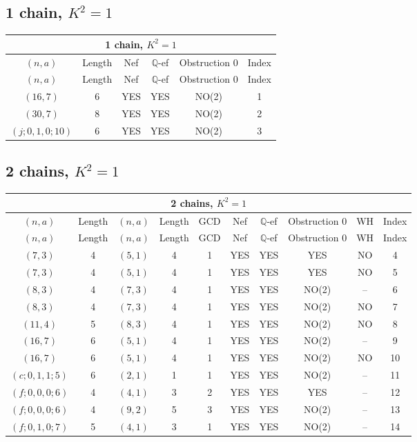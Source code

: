 \subsection{1 chain, $K^2 = 1$}
\begin{longtable}{|c|c|c|c|c|c|}
\hline
\multicolumn{6}{|c|}{1 chain, $K^2 = 1$}\\
\hline
$(n,a)$ & Length & Nef & $\mathbb Q$-ef & Obstruction 0 & Index\\
\hline
\endfirsthead

\hline
$(n,a)$ & Length & Nef & $\mathbb Q$-ef & Obstruction 0 & Index\\
\hline
\endhead
\hline
\endfoot

$(16, 7)$ & 6 & YES & YES & NO(2) & 1\\
$(30, 7)$ & 8 & YES & YES & NO(2) & 2\\
$(j; 0, 1, 0; 10)$ & 6 & YES & YES & NO(2) & 3
\end{longtable}
\subsection{2 chains, $K^2 = 1$}
\begin{longtable}{|c|c|c|c|c|c|c|c|c|c|}
\hline
\multicolumn{10}{|c|}{2 chains, $K^2 = 1$}\\
\hline
$(n,a)$ & Length & $(n,a)$ & Length & GCD & Nef & $\mathbb Q$-ef & Obstruction 0 & WH & Index\\
\hline
\endfirsthead

\hline
$(n,a)$ & Length & $(n,a)$ & Length & GCD & Nef & $\mathbb Q$-ef & Obstruction 0 & WH & Index\\
\hline
\endhead
\hline
\endfoot

$(7, 3)$ & 4 & $(5, 1)$ & 4 & 1 & YES & YES & YES & NO & 4\\
$(7, 3)$ & 4 & $(5, 1)$ & 4 & 1 & YES & YES & YES & NO & 5\\
$(8, 3)$ & 4 & $(7, 3)$ & 4 & 1 & YES & YES & NO(2) & -- & 6\\
$(8, 3)$ & 4 & $(7, 3)$ & 4 & 1 & YES & YES & NO(2) & NO & 7\\
$(11, 4)$ & 5 & $(8, 3)$ & 4 & 1 & YES & YES & NO(2) & NO & 8\\
$(16, 7)$ & 6 & $(5, 1)$ & 4 & 1 & YES & YES & NO(2) & -- & 9\\
$(16, 7)$ & 6 & $(5, 1)$ & 4 & 1 & YES & YES & NO(2) & NO & 10\\
$(c; 0, 1, 1; 5)$ & 6 & $(2, 1)$ & 1 & 1 & YES & YES & NO(2) & -- & 11\\
$(f; 0, 0, 0; 6)$ & 4 & $(4, 1)$ & 3 & 2 & YES & YES & YES & -- & 12\\
$(f; 0, 0, 0; 6)$ & 4 & $(9, 2)$ & 5 & 3 & YES & YES & NO(2) & -- & 13\\
$(f; 0, 1, 0; 7)$ & 5 & $(4, 1)$ & 3 & 1 & YES & YES & NO(2) & -- & 14
\end{longtable}
